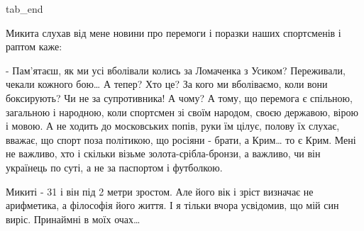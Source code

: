    tab_end
\fi

Микита слухав від мене новини про перемоги і поразки наших спортсменів і раптом
каже: 

- Пам’ятаєш, як ми усі вболівали колись за Ломаченка з Усиком? Переживали,
чекали кожного бою… А тепер? Хто це? За кого ми вболіваємо, коли вони
боксирують? Чи не за супротивника! А чому? А тому, що перемога є спільною,
загальною і народною, коли спортсмен зі своїм народом, своєю державою, вірою і
мовою. А не ходить до московських попів, руки їм цілує, полову їх слухає,
вважає, що спорт поза політикою, що росіяни - брати, а Крим… то є Крим. Мені не
важливо, хто і скільки візьме золота-срібла-бронзи, а важливо, чи він українець
по суті, а не за паспортом і футболкою.

Микиті - 31 і він під 2 метри зростом. Але його вік і зріст визначає не
арифметика, а філософія його життя. І я тільки вчора усвідомив, що мій син
виріс. Принаймні в моїх очах…

